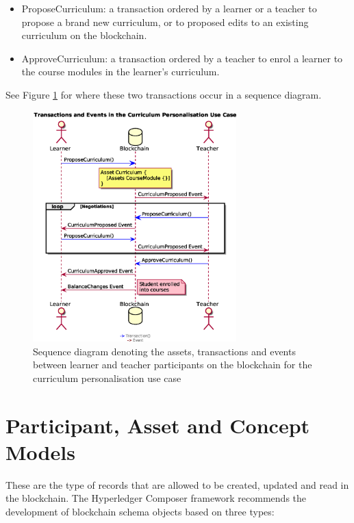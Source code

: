 \begin{itemize}
    \item ProposeCurriculum: a transaction ordered by a learner or a teacher to propose 
    a brand new curriculum, or to proposed edits to an existing curriculum on the blockchain.
    \item ApproveCurriculum: a transaction ordered by a teacher to enrol a learner to 
    the course modules in the learner's curriculum.
\end{itemize}

See Figure \ref{fig:personalisationloop} for where these two transactions occur in a sequence diagram.

\begin{figure}[!ht] 
    \centering    
    \includegraphics[width=0.7\textwidth]{personalisationloop}
    \caption[Curriculum Personalisation Use Case]
        {Sequence diagram denoting the assets, transactions and events between 
         learner and teacher participants on the blockchain for the curriculum personalisation use case} 
    \label{fig:personalisationloop}
\end{figure}



\section{Participant, Asset and Concept Models}

These are the type of records that are allowed to be created, updated and read in the blockchain. 
The Hyperledger Composer framework recommends the development of blockchain schema objects 
based on three types:


